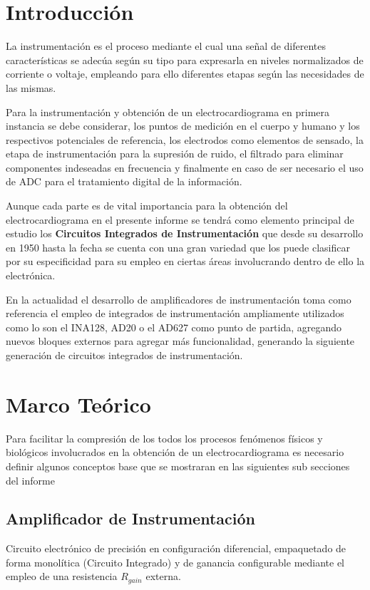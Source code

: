 \documentclass[conference]{IEEEtran}
\begin{document}
	\section{Introducción}
	
	La instrumentación es el proceso mediante el cual una señal de diferentes características se adecúa según su tipo para expresarla en niveles normalizados de corriente o voltaje, empleando para ello diferentes etapas según las necesidades de las mismas.
	
	Para la instrumentación y obtención de un electrocardiograma en primera instancia se debe considerar, los puntos de medición en el cuerpo y humano y los respectivos potenciales de referencia, los electrodos como elementos de sensado, la etapa de instrumentación para la supresión de ruido, el filtrado para eliminar componentes indeseadas en frecuencia y finalmente en caso de ser necesario el uso de ADC para el tratamiento digital de la información.
	
	Aunque cada parte es de vital importancia para la obtención del electrocardiograma en el presente informe se tendrá como elemento principal de estudio los \textbf{Circuitos Integrados de Instrumentación} que desde su desarrollo en 1950 hasta la fecha se cuenta con una gran variedad que los puede clasificar por su especificidad para su empleo en ciertas áreas involucrando dentro de ello la electrónica.
	
	En la actualidad el desarrollo de amplificadores de instrumentación toma como referencia el empleo de integrados de instrumentación ampliamente utilizados como lo son el INA128, AD20 o el AD627 como punto de partida, agregando nuevos bloques externos para agregar más funcionalidad, generando la siguiente generación de circuitos integrados de instrumentación.
	
	\section{Marco Teórico}
	
	Para facilitar la compresión de los todos los procesos fenómenos físicos y biológicos involucrados en la obtención de un electrocardiograma es necesario definir algunos conceptos base que se mostraran en las siguientes sub secciones del informe
	
	\subsection{Amplificador de Instrumentación}
	Circuito electrónico de precisión en configuración diferencial, empaquetado de forma monolítica (Circuito Integrado) y de ganancia configurable mediante el empleo de una resistencia $R_{gain}$ externa.
	
\end{document}
